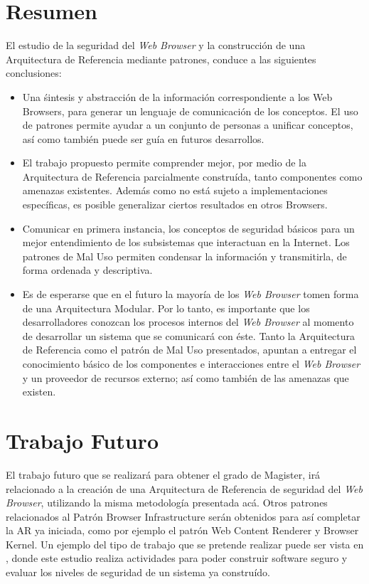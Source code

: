 \section{Resumen}
El estudio de la seguridad del \textit{Web Browser} y la construcción de una Arquitectura de Referencia mediante patrones, conduce a las siguientes conclusiones:
\begin{itemize}
	\item Una śintesis y abstracción de la información correspondiente a los Web Browsers, para generar un lenguaje de comunicación de los conceptos. El uso de patrones permite ayudar a un conjunto de personas a unificar conceptos, así como también puede ser guía en futuros desarrollos.
	\item El trabajo propuesto permite comprender mejor, por medio de la Arquitectura de Referencia parcialmente construída, tanto componentes como amenazas existentes. Además como no está sujeto a implementaciones específicas, es posible generalizar ciertos resultados en otros Browsers.
	\item Comunicar en primera instancia, los conceptos de seguridad básicos para un mejor entendimiento de los subsistemas que interactuan en la Internet. Los patrones de Mal Uso permiten condensar la información y transmitirla, de forma ordenada y descriptiva.
	\item Es de esperarse que en el futuro la mayoría de los \textit{Web Browser} tomen forma de una Arquitectura Modular. Por lo tanto, es importante que los desarrolladores conozcan los procesos internos del \textit{Web Browser} al momento de desarrollar un sistema que se comunicará con éste. Tanto la Arquitectura de Referencia como el patrón de Mal Uso presentados, apuntan a entregar el conocimiento básico de los componentes e interacciones entre el \textit{Web Browser} y un proveedor de recursos externo; así como también de las amenazas que existen.
	
\end{itemize}


\section{Trabajo Futuro}
El trabajo futuro que se realizará para obtener el grado de Magister, irá relacionado a la creación de una Arquitectura de Referencia de seguridad del \textit{Web Browser}, utilizando la misma metodología presentada acá. Otros patrones relacionados al Patrón Browser Infrastructure serán obtenidos para así completar la AR ya iniciada, como por ejemplo el patrón Web Content Renderer y Browser Kernel. Un ejemplo del tipo de trabajo que se pretende realizar puede ser vista en \cite{fernandez2014security}, donde este estudio realiza actividades para poder construir software seguro y evaluar los niveles de seguridad de un sistema ya construído.

